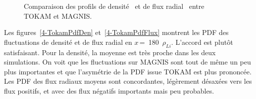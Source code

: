 \begin{refsection}
\begin{figure}[!htbp]
  \centering
    \caption{Comparaison des profils de
    densité~ et de flux
    radial~ entre TOKAM et MAGNIS.}
    \label{4-TokamProfils}
\end{figure}

Les figures~\ref{4-TokamPdfDen} et~\ref{4-TokamPdfFlux} montrent les PDF des
fluctuations de densité et de flux radial en $x\,$=~180~$\rho_{Li}$. L'accord
est plutôt satisfaisant. Pour la densité, la moyenne est très proche dans les
deux simulations. On voit que les fluctuations sur MAGNIS sont tout de même un
peu plus importantes et que l'asymétrie de la PDF issue TOKAM est plus
prononcée.
Les PDF des flux radiaux moyens sont concordantes, légèrement désaxées vers les
flux positifs, et avec des flux négatifs importants mais peu probables.


\end{refsection}
